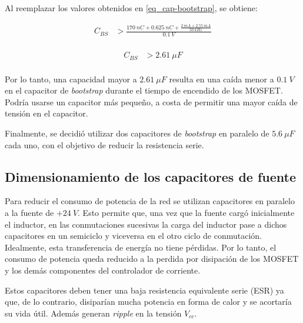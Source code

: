 \noindent Al reemplazar los valores obtenidos en \ref{eq_cap-bootstrap}, se obtiene:

\begin{equation} 
	\begin{aligned}
		C_{BS} &> \frac{170 \:nC + 0.625\:nC + \frac{2 \:mA + 2.55 \:mA}{50 \:kHz}}{0.1 \:V}\\
	\end{aligned}
\end{equation}

\begin{equation} 
	\begin{aligned}
		C_{BS} &> 2.61 \:\mu F\\	
	\end{aligned}
\end{equation}


\noindent Por lo tanto, una capacidad mayor a $2.61 \:\mu F$ resulta en una caída menor a $0.1\:V$ en el capacitor de \textsl{bootstrap} durante el tiempo de encendido de los MOSFET. Podría usarse un capacitor más pequeño, a costa de permitir una mayor caída de tensión en el capacitor. 

\noindent Finalmente, se decidió utilizar dos capacitores de \textsl{bootstrap} en paralelo de $5.6 \:\mu F$ cada uno, con el objetivo de reducir la resistencia serie.

\subsection{Dimensionamiento de los capacitores de fuente}

\noindent Para reducir el consumo de potencia de la red se utilizan capacitores en paralelo a la fuente de $+24\:V$. Esto permite que, una vez que la fuente cargó inicialmente el inductor, en las conmutaciones sucesivas la carga del inductor pase a dichos capacitores en un semiciclo y viceversa en el otro ciclo de conmutación. Idealmente, esta transferencia de energía no tiene pérdidas. Por lo tanto, el consumo de potencia queda reducido a la perdida por disipación de los MOSFET y los demás componentes del controlador de corriente. 

\noindent Estos capacitores deben tener una baja resistencia equivalente serie (ESR) ya que, de lo contrario, disiparían mucha potencia en forma de calor y se acortaría su vida útil. Además generan \textsl{ripple} en la tensión $V_{cc}$.

